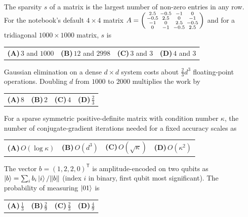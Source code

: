\documentclass[11pt,a4paper]{article}
\newcommand{\optlabel}[1]{\textbf{(#1)}}
\newenvironment{qitem}[1]{\begin{list}{}{\setlength{\leftmargin}{3.3em}\setlength{\labelwidth}{3.1em}%
  \setlength{\labelsep}{0.2em}\setlength{\topsep}{3pt}\setlength{\parsep}{3pt}}\item[\textbf{Q.#1}\hfill]}{\end{list}}
\newcommand{\qsep}{\par\vspace{2pt}{\color{black!15}\hrule}\vspace{4pt}}
\begin{document}
\begin{qitem}{9}
The sparsity $s$ of a matrix is the largest number of non-zero entries in any row. For the notebook's default $4\times4$ matrix
$A = \begin{psmallmatrix}2.5&-0.5&-1&0\\-0.5&2.5&0&-1\\-1&0&2.5&-0.5\\0&-1&-0.5&2.5\end{psmallmatrix}$ and for a tridiagonal $1000\times1000$ matrix, $s$ is
\par\smallskip\noindent\begin{tabularx}{\linewidth}{@{}*{4}{L}@{}}
\optlabel{A}\,$3$ and $1000$ & \optlabel{B}\,$12$ and $2998$ & \optlabel{C}\,$3$ and $3$ & \optlabel{D}\,$4$ and $3$
\end{tabularx}
\end{qitem}
\qsep

\begin{qitem}{10}
Gaussian elimination on a dense $d\times d$ system costs about $\tfrac23d^3$ floating-point operations. Doubling $d$ from $1000$ to $2000$ multiplies the work by
\par\smallskip\noindent\begin{tabularx}{\linewidth}{@{}*{4}{L}@{}}
\optlabel{A}\,$8$ & \optlabel{B}\,$2$ & \optlabel{C}\,$4$ & \optlabel{D}\,$\tfrac23$
\end{tabularx}
\end{qitem}
\qsep

\begin{qitem}{11}
For a sparse symmetric positive-definite matrix with condition number $\kappa$, the number of conjugate-gradient iterations needed for a fixed accuracy
scales as
\par\smallskip\noindent\begin{tabularx}{\linewidth}{@{}*{4}{L}@{}}
\optlabel{A}\,$O(\log\kappa)$ & \optlabel{B}\,$O(d^3)$ & \optlabel{C}\,$O(\sqrt\kappa)$ & \optlabel{D}\,$O(\kappa^2)$
\end{tabularx}
\end{qitem}
\qsep

\begin{qitem}{12}
The vector $b = (1, 2, 2, 0)^{\mathsf T}$ is amplitude-encoded on two qubits as $\ket b = \sum_ib_i\ket i/\|b\|$ (index $i$ in binary, first qubit most significant). The
probability of measuring $\ket{01}$ is
\par\smallskip\noindent\begin{tabularx}{\linewidth}{@{}*{4}{L}@{}}
\optlabel{A}\,$\tfrac13$ & \optlabel{B}\,$\tfrac29$ & \optlabel{C}\,$\tfrac23$ & \optlabel{D}\,$\tfrac49$
\end{tabularx}
\end{qitem}
\qsep
\end{document}
